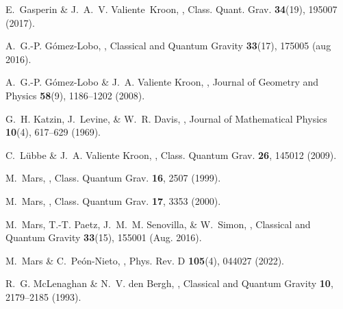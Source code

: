 \documentclass[10pt,a4paper]{article}
\theoremstyle{plain}
\begin{document}
\begin{thebibliography}{10}
E.~Gasperin \& J.~A.~V. Valiente~Kroon,
,
\newblock Class. Quant. Grav. {\bf 34}(19), 195007 (2017).

A.~G.-P. G{\'{o}}mez-Lobo,
,
\newblock Classical and Quantum Gravity {\bf 33}(17), 175005 (aug 2016).

A.~G.-P. Gómez-Lobo \& J.~A. {Valiente Kroon},
,
\newblock Journal of Geometry and Physics {\bf 58}(9), 1186--1202 (2008).

G.~H. Katzin, J.~Levine, \& W.~R. Davis,
,
\newblock Journal of Mathematical Physics {\bf 10}(4), 617--629 (1969).


C.~L\"ubbe \& J.~A. {Valiente Kroon},
,
\newblock Class. Quantum Grav. {\bf 26}, 145012 (2009).

M.~Mars,
,
\newblock Class. Quantum Grav. {\bf 16}, 2507 (1999).

M.~Mars,
,
\newblock Class. Quantum Grav. {\bf 17}, 3353 (2000).

M.~{Mars}, T.-T. {Paetz}, J.~M.~M. {Senovilla}, \& W.~{Simon},
,
\newblock Classical and Quantum Gravity {\bf 33}(15), 155001 (Aug. 2016).

M.~Mars \& C.~Pe\'on-Nieto,
,
\newblock Phys. Rev. D {\bf 105}(4), 044027 (2022).

R.~G. McLenaghan \& N.~V. den Bergh,
,
\newblock Classical and Quantum Gravity {\bf 10}, 2179--2185 (1993).


\end{thebibliography}
\end{document}
